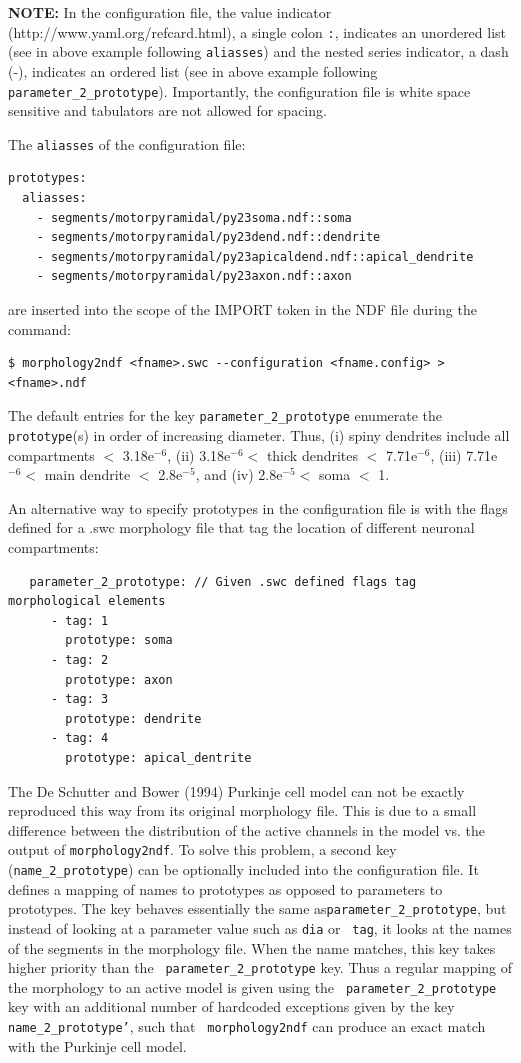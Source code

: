 \documentclass[12pt]{article}
\begin{document}
{\bf NOTE:} In the configuration file, the value indicator
(http://www.yaml.org/refcard.html), a single colon {\tt :}, indicates an
unordered list (see in above example following {\tt aliasses}) and the
nested series indicator, a dash (-), indicates an ordered list (see in
above example following {\tt parameter\_2\_prototype}).  Importantly,
the configuration file is white space sensitive and
tabulators are not allowed for spacing.

The {\tt aliasses} of the configuration file:
\begin{verbatim}
prototypes:
  aliasses:
    - segments/motorpyramidal/py23soma.ndf::soma
    - segments/motorpyramidal/py23dend.ndf::dendrite
    - segments/motorpyramidal/py23apicaldend.ndf::apical_dendrite
    - segments/motorpyramidal/py23axon.ndf::axon
\end{verbatim}
are inserted into the scope of the IMPORT token in the NDF file during
the command:

\begin{verbatim}
$ morphology2ndf <fname>.swc --configuration <fname.config> > <fname>.ndf
\end{verbatim}

The default entries for the key {\tt parameter\_2\_prototype}
enumerate the {\tt prototype}(s) in order of increasing diameter.
Thus, (i) spiny dendrites include all compartments $<$ 3.18e$^{-6}$,
(ii) 3.18e$^{-6} <$ thick dendrites $<$ 7.71e$^{-6}$, (iii)
7.71e$^{-6} <$ main dendrite $<$ 2.8e$^{-5}$, and (iv) 2.8e$^{-5} <$
soma $<$ 1.

An alternative way to specify prototypes in the configuration file is
with the flags defined for a .swc morphology file that tag the
location of different neuronal compartments:

\begin{verbatim}
   parameter_2_prototype: // Given .swc defined flags tag morphological elements
      - tag: 1
        prototype: soma
      - tag: 2
        prototype: axon
      - tag: 3
        prototype: dendrite
      - tag: 4
        prototype: apical_dentrite
\end{verbatim}

The De Schutter and Bower (1994) Purkinje cell model can not be
exactly reproduced this way from its original morphology file.  This
is due to a small difference between the distribution of the active
channels in the model vs. the output of {\tt morphology2ndf}.  To
solve this problem, a second key ({\tt name\_2\_prototype}) can be
optionally included into the configuration file.  It defines a mapping
of names to prototypes as opposed to parameters to prototypes. The key
behaves essentially the same as{\tt parameter\_2\_prototype}, but
instead of looking at a parameter value such as {\tt dia} or {\tt
  tag}, it looks at the names of the segments in the morphology file.
When the name matches, this key takes higher priority than the {\tt
  parameter\_2\_prototype} key.  Thus a regular mapping of the
morphology to an active model is given using the {\tt
  parameter\_2\_prototype} key with an additional number of hardcoded
exceptions given by the key {\tt name\_2\_prototype'}, such that {\tt
  morphology2ndf} can produce an exact match with the Purkinje cell
model.
\end{document}
